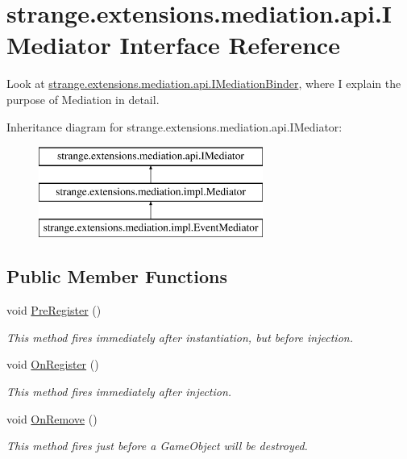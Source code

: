 \hypertarget{interfacestrange_1_1extensions_1_1mediation_1_1api_1_1_i_mediator}{\section{strange.\-extensions.\-mediation.\-api.\-I\-Mediator Interface Reference}
\label{interfacestrange_1_1extensions_1_1mediation_1_1api_1_1_i_mediator}
}


Look at \hyperlink{interfacestrange_1_1extensions_1_1mediation_1_1api_1_1_i_mediation_binder}{strange.\-extensions.\-mediation.\-api.\-I\-Mediation\-Binder}, where I explain the purpose of Mediation in detail.  


Inheritance diagram for strange.\-extensions.\-mediation.\-api.\-I\-Mediator\-:\begin{figure}[H]
\begin{center}
\leavevmode
\includegraphics[height=3.000000cm]{interfacestrange_1_1extensions_1_1mediation_1_1api_1_1_i_mediator}
\end{center}
\end{figure}
\subsection*{Public Member Functions}
\begin{DoxyCompactItemize}
\item 
void \hyperlink{interfacestrange_1_1extensions_1_1mediation_1_1api_1_1_i_mediator_a8e28ff6f8485dbc01aa8c826a45a2797}{Pre\-Register} ()
\begin{DoxyCompactList}\small\item\em This method fires immediately after instantiation, but before injection. \end{DoxyCompactList}\item 
void \hyperlink{interfacestrange_1_1extensions_1_1mediation_1_1api_1_1_i_mediator_a4b16074a7b4cbb23b497e2057b1a316c}{On\-Register} ()
\begin{DoxyCompactList}\small\item\em This method fires immediately after injection. \end{DoxyCompactList}\item 
void \hyperlink{interfacestrange_1_1extensions_1_1mediation_1_1api_1_1_i_mediator_a89be84629dff0c2880605c64dd7fe20d}{On\-Remove} ()
\begin{DoxyCompactList}\small\item\em This method fires just before a Game\-Object will be destroyed. \end{DoxyCompactList}\end{DoxyCompactItemize}
